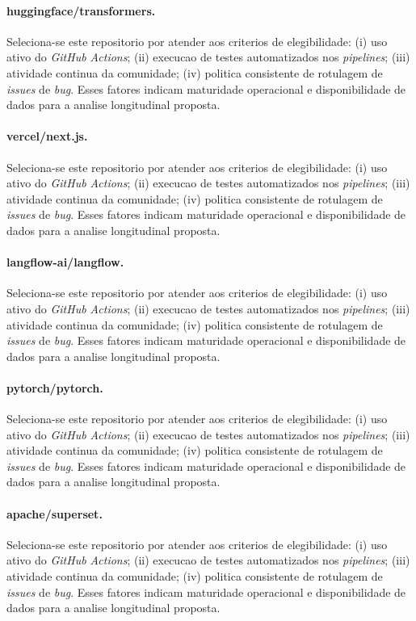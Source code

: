 \paragraph{huggingface/transformers.} Seleciona-se este repositorio por atender aos criterios de elegibilidade: (i) uso ativo do \textit{GitHub Actions}; (ii) execucao de testes automatizados nos \textit{pipelines}; (iii) atividade continua da comunidade; (iv) politica consistente de rotulagem de \textit{issues} de \textit{bug}. Esses fatores indicam maturidade operacional e disponibilidade de dados para a analise longitudinal proposta.
\paragraph{vercel/next.js.} Seleciona-se este repositorio por atender aos criterios de elegibilidade: (i) uso ativo do \textit{GitHub Actions}; (ii) execucao de testes automatizados nos \textit{pipelines}; (iii) atividade continua da comunidade; (iv) politica consistente de rotulagem de \textit{issues} de \textit{bug}. Esses fatores indicam maturidade operacional e disponibilidade de dados para a analise longitudinal proposta.
\paragraph{langflow-ai/langflow.} Seleciona-se este repositorio por atender aos criterios de elegibilidade: (i) uso ativo do \textit{GitHub Actions}; (ii) execucao de testes automatizados nos \textit{pipelines}; (iii) atividade continua da comunidade; (iv) politica consistente de rotulagem de \textit{issues} de \textit{bug}. Esses fatores indicam maturidade operacional e disponibilidade de dados para a analise longitudinal proposta.
\paragraph{pytorch/pytorch.} Seleciona-se este repositorio por atender aos criterios de elegibilidade: (i) uso ativo do \textit{GitHub Actions}; (ii) execucao de testes automatizados nos \textit{pipelines}; (iii) atividade continua da comunidade; (iv) politica consistente de rotulagem de \textit{issues} de \textit{bug}. Esses fatores indicam maturidade operacional e disponibilidade de dados para a analise longitudinal proposta.
\paragraph{apache/superset.} Seleciona-se este repositorio por atender aos criterios de elegibilidade: (i) uso ativo do \textit{GitHub Actions}; (ii) execucao de testes automatizados nos \textit{pipelines}; (iii) atividade continua da comunidade; (iv) politica consistente de rotulagem de \textit{issues} de \textit{bug}. Esses fatores indicam maturidade operacional e disponibilidade de dados para a analise longitudinal proposta.
